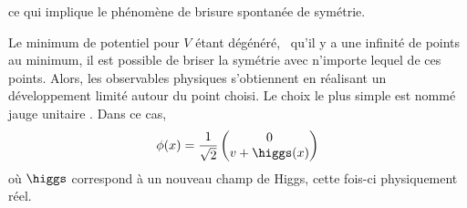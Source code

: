ce qui implique le phénomène de brisure spontanée de symétrie.
\par Le minimum de potentiel pour $V$ étant dégénéré, \ie\ qu'il y a une infinité de points au minimum, il est possible de briser la symétrie avec n'importe lequel de ces points. Alors, les observables physiques s'obtiennent en réalisant un développement limité autour du point choisi.
Le choix le plus simple est nommé \og jauge unitaire \fg.
Dans ce cas, %
\begin{equation}
\phi(x)
=
\frac{1}{\sqrt{2}}
\begin{pmatrix}
0 \\ v + \higgs(x)
\end{pmatrix}
\end{equation}
où $\higgs$ correspond à un nouveau champ de Higgs, cette fois-ci physiquement réel.%
